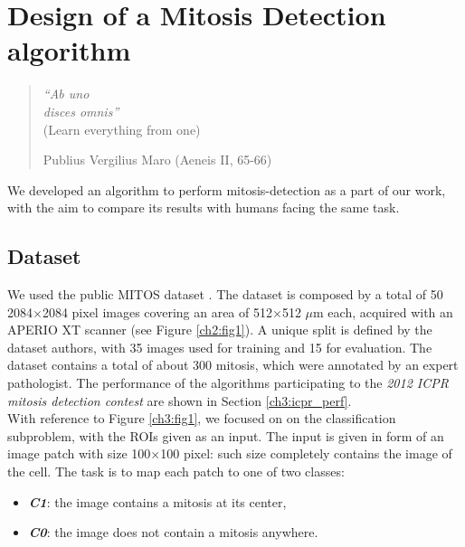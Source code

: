 \chapter{Design of a Mitosis Detection algorithm}
\label{chapter4}
\thispagestyle{empty}

\begin{quotation}
{\footnotesize
\noindent \emph{\textquotedblleft Ab uno\\ disces omnis\textquotedblright}\\
\noindent (Learn everything from one)
\begin{flushright}
Publius Vergilius Maro (Aeneis II, 65-66)
\end{flushright}
}
\end{quotation}

\vspace{0.5cm}


We developed an algorithm to perform mitosis-detection as a part of our work, with the aim to compare its results with humans facing the same task.

\section{Dataset}
\label{ch4:ds}

We used the public MITOS dataset \cite{icpr}. The dataset is composed by a total of 50 2084$\times$2084 pixel images
covering an area of 512$\times$512 $\mu$m each, acquired with an APERIO XT scanner (see Figure \ref{ch2:fig1}). 
A unique split is defined by the dataset authors, with 35 images used for training and 15 for evaluation.
The dataset contains a total of about 300 mitosis, which were annotated by an expert pathologist.
The performance of the algorithms participating to the \textit{2012 ICPR mitosis detection contest} are shown in Section \ref{ch3:icpr_perf}.\\
With reference to Figure \ref{ch3:fig1}, we focused on on the classification subproblem, with the \Glspl{ROI} given as an input.
The input is given in form of an image patch with size 100$\times$100 pixel: such size completely contains the image of the cell.
The task is to map each patch to one of two classes:
\begin{itemize}
 \item [] \textit{\textbf{C1}}: the image contains a mitosis at its center,
 \item [] \textit{\textbf{C0}}: the image does not contain a mitosis anywhere. 
\end{itemize}


